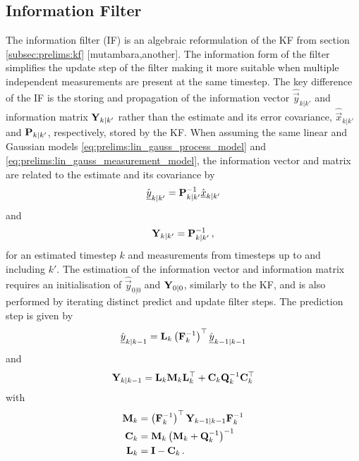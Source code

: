 \subsection{Information Filter}\label{subsec:prelims:if}
The information filter (IF) is an algebraic reformulation of the KF from section \ref{subsec:prelims:kf} [mutambara,another]. The information form of the filter simplifies the update step of the filter making it more suitable when multiple independent measurements are present at the same timestep. The key difference of the IF is the storing and propagation of the information vector $\hat{\vec{y}}_{k|k'}$ and information matrix ${{\mathbf{Y}}}_{k|k'}$ rather than the estimate and its error covariance, $\hat{\vec{x}}_{k|k'}$ and ${{\mathbf{P}}}_{k|k'}$, respectively, stored by the KF. When assuming the same linear and Gaussian models \eqref{eq:prelims:lin_gauss_process_model} and \eqref{eq:prelims:lin_gauss_measurement_model}, the information vector and matrix are related to the estimate and its covariance by
\begin{equation}\label{eq:prelims:info_vec_defn}
    \hat{{\underline{y}}}_{k|k'} = {{\mathbf{P}}}_{k|k'}^{-1}\hat{{\underline{x}}}_{k|k'}
\end{equation}
and
\begin{equation}\label{eq:prelims:info_mat_defn}
    {\ensuremath{{\mathbf{Y}}}}_{k|k'} = {{\mathbf{P}}}_{k|k'}^{-1}\,,
\end{equation}
for an estimated timestep $k$ and measurements from timesteps up to and including $k'$. The estimation of the information vector and information matrix requires an initialisation of $\hat{\vec{y}}_{0|0}$ and ${{\mathbf{Y}}}_{0|0}$, similarly to the KF, and is also performed by iterating distinct predict and update filter steps. The prediction step is given by
\begin{equation}\label{eq:prelims:if_info_vec_predict}
    \hat{{\underline{y}}}_{k|k-1} = {{\mathbf{L}}}_k\left({{\mathbf{F}}}_k^{-1}\right)^\top\hat{{\underline{y}}}_{k-1|k-1}
\end{equation}
and
\begin{equation}\label{eq:prelims:if_info_mat_predict}
    {\ensuremath{{\mathbf{Y}}}}_{k|k-1} = {{\mathbf{L}}}_k{{\mathbf{M}}}_k{{\mathbf{L}}}_k^\top + {{\mathbf{C}}}_k{{\mathbf{Q}}}_k^{-1}{{\mathbf{C}}}_k^\top
\end{equation}
with
\begin{align}
    {\ensuremath{{\mathbf{M}}}}_k &= \left({{\mathbf{F}}}_k^{-1}\right)^\top{\ensuremath{{\mathbf{Y}}}}_{k-1|k-1}{{\mathbf{F}}}_k^{-1}\\
    {{\mathbf{C}}}_k &= {{\mathbf{M}}}_k\left({{\mathbf{M}}}_k + {{\mathbf{Q}}}_k^{-1}\right)^{-1}\\
    {{\mathbf{L}}}_k &= {{\mathbf{I}}} - {{\mathbf{C}}}_k\,.
\end{align}
